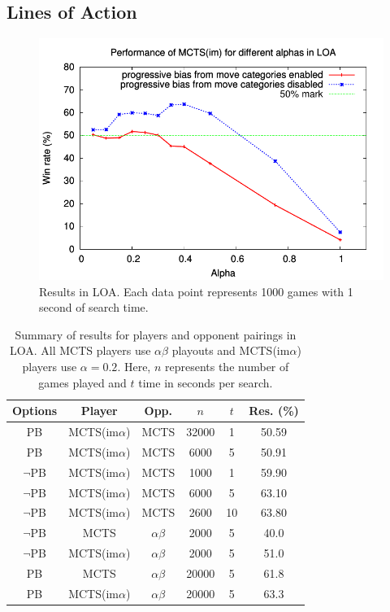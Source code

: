 \documentclass[conference]{IEEEtran}
\begin{document}
\subsection{Lines of Action}

\begin{figure}[t]
\begin{center}
\includegraphics[scale=0.7]{plots/loa-alpha}
\caption{Results in LOA. Each data point represents 1000 games with 1 second of search time. } 
\label{fig:loa-alpha}
\end{center}
\end{figure}

\begin{table}[t]
{\small
\begin{center}
\begin{tabular}{ccccc|c}
Options & Player        & Opp. & $n$ & $t$ & Res. (\%) \\
\hline
\hline
PB      & MCTS(im$\alpha$) & MCTS     & 32000 & 1        & 50.59       \\
PB      & MCTS(im$\alpha$) & MCTS     & 6000  & 5        & 50.91       \\
\hline
$\neg$PB & MCTS(im$\alpha$) & MCTS & 1000 & 1  & 59.90       \\
$\neg$PB & MCTS(im$\alpha$) & MCTS & 6000 & 5  & 63.10       \\
$\neg$PB & MCTS(im$\alpha$) & MCTS & 2600 & 10 & 63.80       \\
\hline
$\neg$PB & MCTS             & $\alpha \beta$ & 2000 & 5  & 40.0       \\
$\neg$PB & MCTS(im$\alpha$) & $\alpha \beta$ & 2000 & 5 & 51.0       \\
\hline
PB       & MCTS             & $\alpha \beta$ & 20000 & 5  & 61.8       \\
PB       & MCTS(im$\alpha$) & $\alpha \beta$ & 20000 & 5  & 63.3       \\
\hline
\end{tabular}
\end{center}
\caption{Summary of results for players and opponent pairings in LOA. 
All MCTS players use $\alpha \beta$ playouts and MCTS(im$\alpha$) players use $\alpha = 0.2$. 
Here, $n$ represents the number of games played and $t$ time in seconds per search.}
\label{tbl:loaresults}
}
\end{table}
\end{document}
